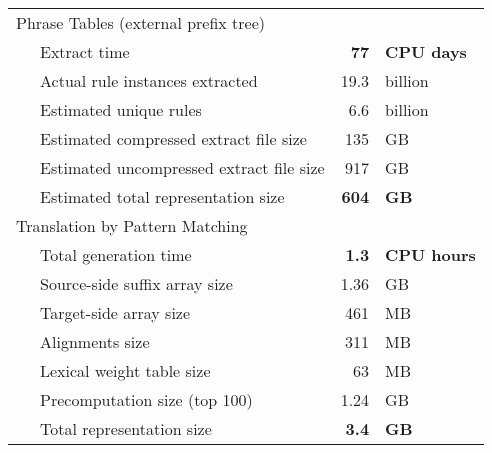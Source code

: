 \begin{tabular}{llr@{~}l}
	\multicolumn{2}{l}{Phrase Tables (external prefix tree)} & & \\
	~ & Extract time & \bf{77} & \bf{CPU days} \\
	~ & Actual rule instances extracted & 19.3 & billion \\
	~ & Estimated unique rules & 6.6 & billion\\
	~ & Estimated compressed extract file size & 135 & GB \\
	~ & Estimated uncompressed extract file size & 917 & GB \\
	~ & Estimated total representation size & \bf{604} & \bf{GB} \\
	\multicolumn{2}{l}{Translation by Pattern Matching} & & \\
	~ & Total generation time & \bf{1.3} & \bf{CPU hours} \\
	~ & Source-side suffix array size & 1.36 & GB \\
	~ & Target-side array size & 461 & MB\\
	~ & Alignments size & 311 & MB \\
	~ & Lexical weight table size & 63 & MB \\
	~ & Precomputation size (top 100) & 1.24 & GB \\
	~ & Total representation size & \bf{3.4} & \bf{GB} \\
\end{tabular}




